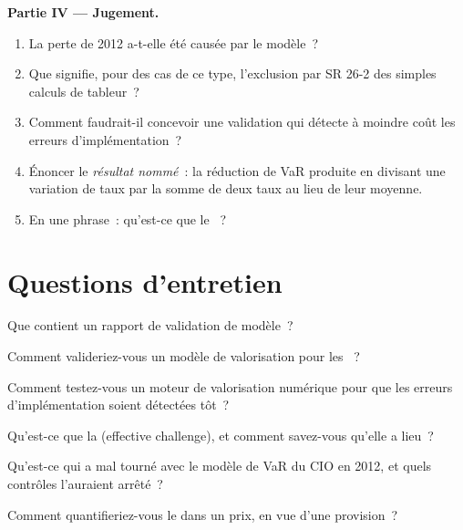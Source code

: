 \begin{problem}
\medskip\noindent\textbf{Partie IV --- Jugement.}
\begin{enumerate}[resume]
\item La perte de 2012 a-t-elle été causée par le modèle~?
\item Que signifie, pour des cas de ce type, l'exclusion par SR 26-2 des simples calculs de tableur~?
\item Comment faudrait-il concevoir une validation qui détecte à moindre coût les erreurs d'implémentation~?
\item Énoncer le \emph{résultat nommé}~: la réduction de VaR produite en divisant une variation de taux par la somme de
deux taux au lieu de leur moyenne.
\item En une phrase~: qu'est-ce que le ~?
\end{enumerate}
\end{problem}

\section{Questions d'entretien}

\begin{interviewq}\label{iq:rc:model-risk-and-validation:1}
Que contient un rapport de validation de modèle~?
\end{interviewq}

\begin{interviewq}\label{iq:rc:model-risk-and-validation:2}
Comment valideriez-vous un modèle de valorisation pour les ~?
\end{interviewq}

\begin{interviewq}\label{iq:rc:model-risk-and-validation:3}
Comment testez-vous un moteur de valorisation numérique pour que les erreurs d'implémentation soient détectées tôt~?
\end{interviewq}

\begin{interviewq}\label{iq:rc:model-risk-and-validation:4}
Qu'est-ce que la  (effective challenge), et comment savez-vous qu'elle a lieu~?
\end{interviewq}

\begin{interviewq}\label{iq:rc:model-risk-and-validation:5}
Qu'est-ce qui a mal tourné avec le modèle de VaR du CIO en 2012, et quels contrôles l'auraient arrêté~?
\end{interviewq}

\begin{interviewq}\label{iq:rc:model-risk-and-validation:6}
Comment quantifieriez-vous le  dans un prix, en vue d'une provision~?
\end{interviewq}
